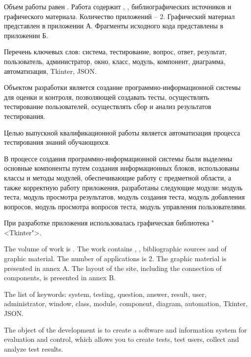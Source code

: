 
Объем работы равен . Работа содержит , ,  библиографических источников и  графического материала. Количество приложений – 2. Графический материал представлен в приложении А. Фрагменты исходного кода представлены в приложении Б.

Перечень ключевых слов: система, тестирование, вопрос, ответ, результат, пользователь, администратор, окно, класс, модуль, компонент, диаграмма, автоматизация, Tkinter, JSON.

Объектом разработки является создание программно-информационной системы для оценки и контроля, позволяющей создавать тесты, осуществлять тестирование пользователей, осуществлять сбор и анализ результатов тестирования.

Целью выпускной квалификационной работы является автоматизация процесса тестирования знаний обучающихся.

В процессе создания программно-информационной системы были выделены основные компоненты путем создания информационных блоков, использованы классы и методы модулей, обеспечивающие работу с предметной области, а также корректную работу приложения, разработаны следующие модули: модуль теста, модуль просмотра результатов, модуль создания теста, модуль добавления вопросов, модуль просмотра вопросов теста, модуль управления пользователями.

При разработке приложения использовалась графическая библиотека "<Tkinter">.

  
The volume of work is . The work contains , ,  bibliographic sources and  of graphic material. The number of applications is 2. The graphic material is presented in annex A. The layout of the site, including the connection of components, is presented in annex B.

The list of keywords: system, testing, question, answer, result, user, administrator, window, class, module, component, diagram, automation, Tkinter, JSON.

The object of the development is to create a software and information system for evaluation and control, which allows you to create tests, test users, collect and analyze test results.

